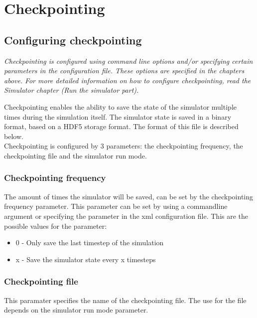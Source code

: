 
\chapter{Checkpointing}
\label{chap:checkpointing}


\section{Configuring checkpointing}
	\textit{Checkpointing is configured using command line options and/or specifying certain parameters in the configuration file. These options are specified in the chapters above.}
	\textit{For more detailed information on how to configure checkpointing, read the Simulator chapter (Run the simulator part).}


	Checkpointing enables the ability to save the state of the simulator multiple times during the simulation itself. The simulator state is saved in a binary format, based on a HDF5 storage format. The format of this file is described below. \\
	Checkpointing is configured by 3 parameters: the checkpointing frequency, the checkpointing file and the simulator run mode. \\


\subsection{Checkpointing frequency}
	The amount of times the simulator will be saved, can be set by the checkpointing frequency parameter. This parameter can be set by using a commandline argument or specifying the parameter in the xml configuration file. This are the possible values for the parameter: \\
	\begin{itemize}
		\item 0 - Only save the last timestep of the simulation
		\item x - Save the simulator state every x timesteps
	\end{itemize}

\subsection{Checkpointing file}
	This paramater specifies the name of the checkpointing file. The use for the file depends on the simulator run mode parameter.

